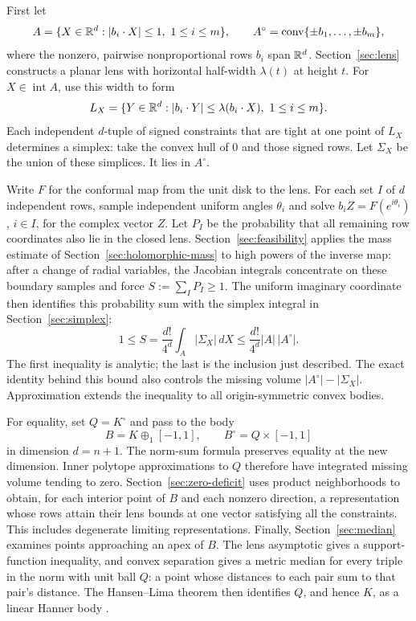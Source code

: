First let
\[
 A=\{X\in\mathbb R^d:|b_i\cdot X|\le1,\ 1\le i\le m\},
 \qquad A^\circ=\operatorname{conv}\{\pm b_1,\ldots,\pm b_m\},
\]
where the nonzero, pairwise nonproportional rows $b_i$ span $\mathbb R^d$.
Section~\ref{sec:lens} constructs
a planar lens with horizontal half-width $\lambda(t)$ at height $t$.
For $X\in\operatorname{int}A$, use this width to form
\[
 L_X=\{Y\in\mathbb R^d:|b_i\cdot Y|\le\lambda(b_i\cdot X),\ 1\le i\le m\}.
\]
Each independent $d$-tuple of signed constraints that are tight at
one point of $L_X$ determines a simplex: take the convex hull of $0$
and those signed rows. Let $\Sigma_X$ be the union of these simplices.
It lies in $A^\circ$.

Write $F$ for the conformal map from the unit disk to the lens.
For each set $I$ of $d$ independent rows, sample independent uniform angles
$\theta_i$ and solve $b_iZ=F(e^{i\theta_i})$, $i\in I$, for the
complex vector $Z$. Let $P_I$ be the probability that all remaining
row coordinates also lie in the closed lens. Section~\ref{sec:feasibility}
applies the mass estimate of Section~\ref{sec:holomorphic-mass} to high
powers of the inverse map: after a change of radial variables, the
Jacobian integrals concentrate on these boundary samples and force
$S:=\sum_I P_I\ge1$.
The uniform imaginary coordinate then identifies this probability sum
with the simplex integral in Section~\ref{sec:simplex}:
\[
 1\le S=\frac{d!}{4^d}\int_A|\Sigma_X|\,dX
                    \le\frac{d!}{4^d}|A|\,|A^\circ|.
\]
The first inequality is analytic; the last is the inclusion just
described. The exact identity behind this bound also controls the
missing volume $|A^\circ|-|\Sigma_X|$. Approximation extends the
inequality to all origin-symmetric convex bodies.

For equality, set $Q=K^\circ$ and pass to the body
\[
 B=K\oplus_1[-1,1],\qquad B^\circ=Q\times[-1,1]
\]
in dimension $d=n+1$. The norm-sum formula preserves equality at the
new dimension. Inner polytope approximations to $Q$ therefore have
integrated missing volume tending to zero. Section~\ref{sec:zero-deficit}
uses product neighborhoods to obtain, for each interior point of $B$
and each nonzero direction, a representation whose rows attain their
lens bounds at one vector satisfying all the constraints. This includes
degenerate limiting representations.
Finally, Section~\ref{sec:median} examines points approaching an apex
of $B$. The lens asymptotic gives a support-function inequality,
and convex separation gives a metric median for every triple in the
norm with unit ball $Q$: a point whose distances to each pair sum to
that pair's distance. The Hansen--Lima theorem then identifies $Q$,
and hence $K$, as a linear Hanner body
\cite[Corollary~7.4]{HansenLima1981}.

